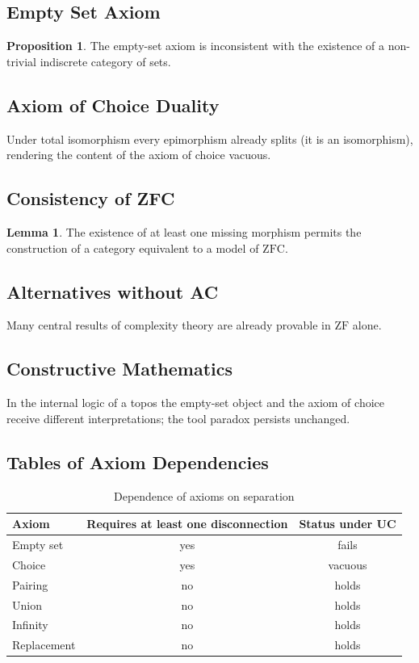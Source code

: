 \documentclass[11pt,a4paper]{article}
\theoremstyle{definition}
\newtheorem{lemma}[theorem]{Lemma}
\newtheorem{proposition}[theorem]{Proposition}
\begin{document}
\subsection{Empty Set Axiom}
\begin{proposition}
The empty-set axiom is inconsistent with the existence of a non-trivial indiscrete category of sets.
\end{proposition}

\subsection{Axiom of Choice Duality}
Under total isomorphism every epimorphism already splits (it is an isomorphism), rendering the content of the axiom of choice vacuous.

\subsection{Consistency of ZFC}
\begin{lemma}
The existence of at least one missing morphism permits the construction of a category equivalent to a model of \(\mathrm{ZFC}\).
\end{lemma}

\subsection{Alternatives without AC}
Many central results of complexity theory are already provable in \(\mathrm{ZF}\) alone.

\subsection{Constructive Mathematics}
In the internal logic of a topos the empty-set object and the axiom of choice receive different interpretations; the tool paradox persists unchanged.

\subsection{Tables of Axiom Dependencies}
\begin{table}[h]
\centering
\caption{Dependence of axioms on separation}
\begin{tabular}{lcc}
\toprule
Axiom & Requires at least one disconnection & Status under UC \\
\midrule
Empty set & yes & fails \\
Choice & yes & vacuous \\
Pairing & no & holds \\
Union & no & holds \\
Infinity & no & holds \\
Replacement & no & holds \\
\bottomrule
\end{tabular}
\end{table}
\end{document}
